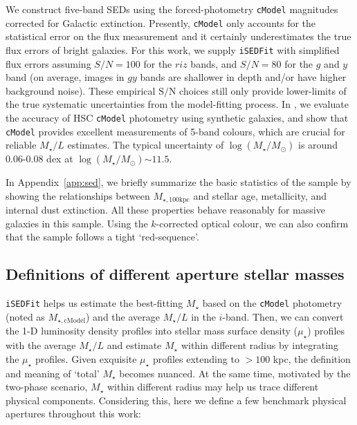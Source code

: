 \documentclass[fleqn,usenatbib]{mnras}
\def\cmodel{\texttt{cModel}}
\def\mstar{{$M_{\star}$}}
\def\logms{{$\log (M_{\star}/M_{\odot})$}}
\def\mtot{{$M_{\star,100\mathrm{kpc}}$}}
\def\mcmodel{{$M_{\star,\mathrm{cModel}}$}}
\def\m2l{{$M_{\star}/L$}}
\def\s2n{{$\mathrm{S}/\mathrm{N}$}}
\def\mden{{$\mu_{\star}$}}
\begin{document}
    We construct five-band SEDs using the forced-photometry \cmodel{} magnitudes 
    corrected for Galactic extinction. 
    Presently, \cmodel{} only accounts for the statistical error on the flux 
    measurement and it certainly underestimates the true flux errors of bright 
    galaxies.  
    For this work, we supply \texttt{iSEDFit} with simplified flux errors assuming 
    $S/N = 100$ for the $riz$ bands, and $S/N = 80$ for the $g$ and $y$ band 
    (on average, images in $gy$ bands are shallower in depth and/or have higher 
    background noise).  
    These empirical \s2n{} choices still only provide lower-limits of the true 
    systematic uncertainties from the model-fitting process. 
    In \citealt{SynPipe}, we evaluate the accuracy of HSC \cmodel{} photometry 
    using synthetic galaxies, and show that \cmodel{} provides excellent measurements 
    of 5-band colours, which are crucial for reliable \m2l{} estimates.
    The typical uncertainty of \logms{} is around 0.06-0.08 dex at \logms${\sim} 11.5$.
    
    In Appendix~\ref{app:sed}, we briefly summarize the basic statistics of 
    the sample by showing the relationships between \mtot{} and stellar age, 
    metallicity, and internal dust extinction. 
    All these properties behave reasonably for massive galaxies in this sample. 
    Using the $k$-corrected optical colour, we can also confirm that the sample 
    follows a tight `red-sequence'.  
      


\subsection{Definitions of different aperture stellar masses}
    \label{ssec:mtotal}
    
    \texttt{iSEDFit} helps us estimate the best-fitting \mstar{} based on the \cmodel{} 
    photometry (noted as \mcmodel{}) and the average \m2l{} in the $i$-band. 
    Then, we can convert the 1-D luminosity density profiles into stellar mass 
    surface density (\mden{}) profiles with the average \m2l{} and estimate \mstar{} 
    within different radius by integrating the \mden{} profiles. 
    Given exquisite \mden{} profiles extending to $>100$ kpc, the definition and meaning 
    of `total' \mstar{} becomes nuanced.
    At the same time, motivated by the two-phase scenario, \mstar{} within different 
    radius may help us trace different physical components. 
    Considering this, here we define a few benchmark physical apertures throughout 
    this work:   
\end{document}
